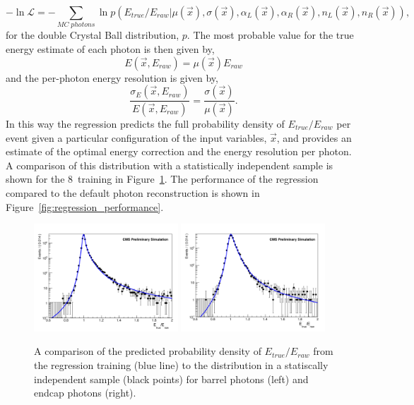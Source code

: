\begin{equation}
  -\ln \mathcal{L} = - \sum_{MC \; photons} \ln p(E_{true}/E_{raw} | \mu(\vec{x}),\sigma(\vec{x}),\alpha_{L}(\vec{x}),\alpha_{R}(\vec{x}),n_{L}(\vec{x}),n_{R}(\vec{x})),
\end{equation}
for the double Crystal Ball distribution, $p$. The most probable value for the true energy estimate of each photon is then given by,
\begin{equation}
  E(\vec{x},E_{raw}) = \mu(\vec{x})E_{raw}
\end{equation}
and the per-photon energy resolution is given by, 
\begin{equation}
  \frac{\sigma_{E}(\vec{x},E_{raw})}{E(\vec{x},E_{raw})} = \frac{\sigma(\vec{x})}{\mu(\vec{x})}.
\end{equation}
In this way the regression predicts the full probability density of $E_{true}/E_{raw}$ per event given a particular configuration of the input variables, $\vec{x}$, and provides an estimate of the optimal energy correction and the energy resolution per photon. A comparison of this distribution with a statistically independent \MC sample is shown for the 8~\TeV training in Figure~\ref{fig:regression_training}. The performance of the regression compared to the default photon reconstruction is shown in Figure~\ref{fig:regression_performance}.

\begin{figure}
  \includegraphics[width=0.48\textwidth]{analysis_comps/plots/regression_barrel_fix.pdf}
  \includegraphics[width=0.48\textwidth]{analysis_comps/plots/regression_endcap_fix.pdf}
  \caption[A comparison of the predicted probability density of $E_{true}/E_{raw}$ from the regression training to the distribution in a statistically independent sample]{A comparison of the predicted probability density of $E_{true}/E_{raw}$ from the regression training (blue line) to the distribution in a statiscally independent \MC sample (black points) for barrel photons (left) and endcap photons (right).}
  \label{fig:regression_training}
\end{figure}

